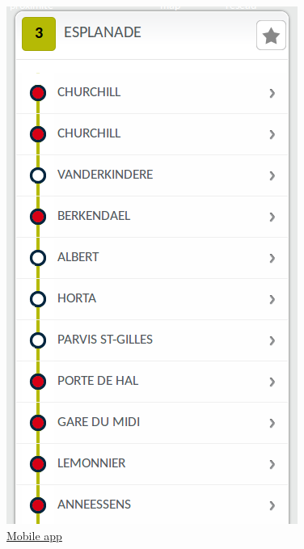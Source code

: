 \documentclass[11pt]{article}%
\begin{document}
\begin{minipage}{0.25\textwidth}
  \begin{figure}[H]
    \center
    \includegraphics[width=\textwidth]{images/stibmobile.png}
    \caption{\href{http://m.stib.be/}{Mobile app}}
  \end{figure}
\end{minipage}\hfill
\end{document}
